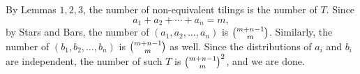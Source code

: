 By Lemmas $1,2,3$, the number of non-equivalent tilings is the number of $T$. Since \[a_1+a_2+\cdots+a_n=m,\]
by Stars and Bars, the number of $(a_1,a_2,\ldots,a_n)$ is $\tbinom{m+n-1}m$. Similarly, the number of $(b_1,b_2,\ldots,b_n)$ is $\tbinom{m+n-1}m$ as well. Since the distributions of $a_i$ and $b_i$ are independent, the number of such $T$ is $\tbinom{m+n-1}m^2$, and we are done.
